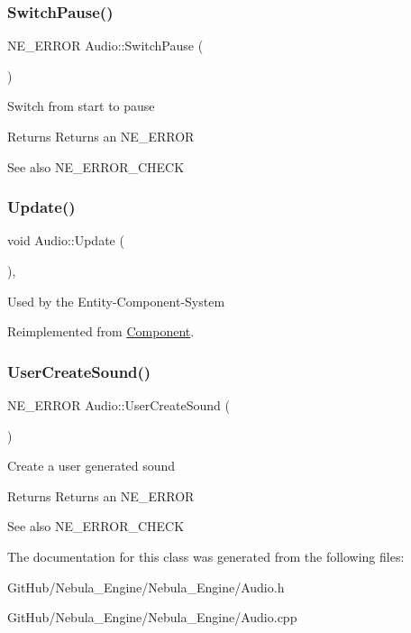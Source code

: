 \subsubsection{\texorpdfstring{SwitchPause()}{SwitchPause()}}
{\footnotesize\ttfamily N\+E\+\_\+\+E\+R\+R\+OR Audio\+::\+Switch\+Pause (\begin{DoxyParamCaption}{ }\end{DoxyParamCaption})}

Switch from start to pause \begin{DoxyReturn}{Returns}
Returns an N\+E\+\_\+\+E\+R\+R\+OR 
\end{DoxyReturn}
\begin{DoxySeeAlso}{See also}
N\+E\+\_\+\+E\+R\+R\+O\+R\+\_\+\+C\+H\+E\+CK 
\end{DoxySeeAlso}
\mbox{\label{class_audio_a2bf85fb3962720a9dce2bdfa988b0f11}} 
\subsubsection{\texorpdfstring{Update()}{Update()}}
{\footnotesize\ttfamily void Audio\+::\+Update (\begin{DoxyParamCaption}{ }\end{DoxyParamCaption})\hspace{0.3cm}{\ttfamily [override]}, {\ttfamily [virtual]}}

Used by the Entity-\/\+Component-\/\+System 

Reimplemented from \mbox{\hyperlink{class_component}{Component}}.

\mbox{\label{class_audio_a74ba8f7352c4d8c3a248d9eda9ff03bd}} 
\subsubsection{\texorpdfstring{UserCreateSound()}{UserCreateSound()}}
{\footnotesize\ttfamily N\+E\+\_\+\+E\+R\+R\+OR Audio\+::\+User\+Create\+Sound (\begin{DoxyParamCaption}{ }\end{DoxyParamCaption})}

Create a user generated sound \begin{DoxyReturn}{Returns}
Returns an N\+E\+\_\+\+E\+R\+R\+OR 
\end{DoxyReturn}
\begin{DoxySeeAlso}{See also}
N\+E\+\_\+\+E\+R\+R\+O\+R\+\_\+\+C\+H\+E\+CK 
\end{DoxySeeAlso}


The documentation for this class was generated from the following files\+:\begin{DoxyCompactItemize}
\item 
Git\+Hub/\+Nebula\+\_\+\+Engine/\+Nebula\+\_\+\+Engine/Audio.\+h\item 
Git\+Hub/\+Nebula\+\_\+\+Engine/\+Nebula\+\_\+\+Engine/Audio.\+cpp\end{DoxyCompactItemize}
